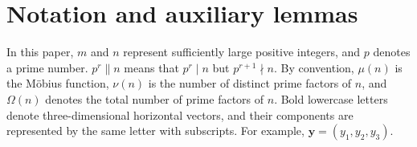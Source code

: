 \documentclass[10pt,a4paper]{amsart}
\numberwithin{equation}{section}
\begin{document}
\section{Notation and auxiliary lemmas}
\setcounter{lemma}{0}
\setcounter{theorem}{0}
\setcounter{corollary}{0}
\setcounter{remark}{0}
\setcounter{equation}{0}
In this paper, $m$ and $n$ represent sufficiently large positive integers, and $p$ denotes a prime number. $p^r \parallel n$ means that $p^r \mid n$ but $p^{r+1} \nmid n$. By convention, $\mu(n)$ is the M\"obius function, $\nu(n)$ is the number of distinct prime factors of $n$,
and $\Omega(n)$ denotes the total number of prime factors of $n$. 
Bold lowercase letters denote three-dimensional horizontal vectors, and their components are represented by the same letter with subscripts. For example, $\mathbf{y} = (y_1, y_2, y_3)$.
\end{document}

